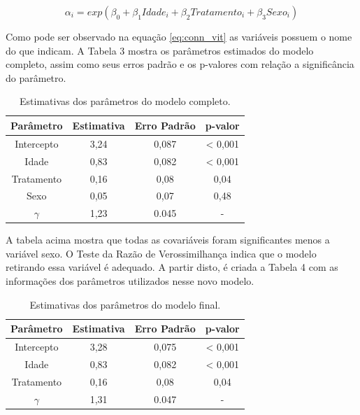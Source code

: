\documentclass[a4paper,12pt]{article}
\begin{document}
\begin{equation} \label{eq:conn_vit}
\alpha_i = exp(\beta_0 + \beta_1Idade_i + \beta_2Tratamento_i + \beta_3Sexo_i)
\end{equation}

Como pode ser observado na equação \ref{eq:conn_vit} as variáveis possuem o nome do que indicam. A Tabela 3 mostra os parâmetros estimados do modelo completo, assim como seus erros padrão e os p-valores com relação a significância do parâmetro.

\begin{table}[H]
\centering
\caption{Estimativas dos parâmetros do modelo completo.}
\begin{tabular}{c|ccc}
\hline
Parâmetro & Estimativa & Erro Padrão & p-valor \\
\hline
Intercepto & 3,24 & 0,087 & < 0,001 \\

Idade & 0,83 & 0,082 & < 0,001 \\

Tratamento & 0,16 & 0,08 & 0,04 \\

Sexo & 0,05 & 0,07 & 0,48 \\

$\gamma$ & 1,23 & 0.045 & - \\
\hline
\end{tabular}
\end{table}

A tabela acima mostra que todas as covariáveis foram significantes menos a variável sexo. O Teste da Razão de Verossimilhança indica que o modelo retirando essa variável é adequado. A partir disto, é criada a Tabela 4 com as informações dos parâmetros utilizados nesse novo modelo.

\begin{table}[H]
\centering
\caption{Estimativas dos parâmetros do modelo final.}
\begin{tabular}{c|ccc}
\hline
Parâmetro & Estimativa & Erro Padrão & p-valor \\
\hline
Intercepto & 3,28 & 0,075 & < 0,001 \\

Idade & 0,83 & 0,082 & < 0,001 \\

Tratamento & 0,16 & 0,08 & 0,04 \\

$\gamma$ & 1,31 & 0.047 & - \\
\hline
\end{tabular}
\end{table}
\end{document}
